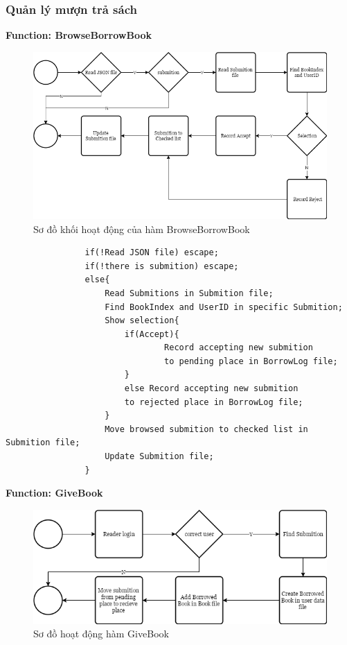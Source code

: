 \documentclass[12pt,a4paper]{report}
\begin{document}
            \subsubsection{Quản lý mượn trả sách}
                \textbf{Function: BrowseBorrowBook}
                \begin{figure}[H]
                    \centering
                    \label{F:browsebook}
                    \includegraphics[scale = .4]{browsebook.png}
                    \caption{Sơ đồ khối hoạt động của hàm BrowseBorrowBook}
                \end{figure}
                \begin{verbatim}
                if(!Read JSON file) escape;
                if(!there is submition) escape;
                else{
                    Read Submitions in Submition file;
                    Find BookIndex and UserID in specific Submition;
                    Show selection{
                        if(Accept){
                                Record accepting new submition 
                                to pending place in BorrowLog file;
                        }
                        else Record accepting new submition 
                        to rejected place in BorrowLog file;
                    }
                    Move browsed submition to checked list in Submition file;
                    Update Submition file;
                }
                \end{verbatim}
                \newpage
                \textbf{Function: GiveBook}
                \begin{figure}[H]
                    \centering
                    \label{G:givebook}
                    \includegraphics[scale = .4]{givebook.png}
                    \caption{Sơ đồ hoạt động hàm GiveBook}
                \end{figure}
\end{document}
